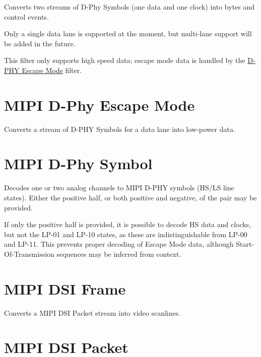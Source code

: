 Converts two streams of D-Phy Symbols (one data and one clock) into bytes and control events.

Only a single data lane is supported at the moment, but multi-lane support will be added in the future.

This filter only supports high speed data; escape mode data is handled by the \hyperref[filter:dphyescape]{D-PHY Escape
Mode} filter.

\pagebreak
\section{MIPI D-Phy Escape Mode}
\label{filter:dphyescape}

Converts a stream of D-PHY Symbols for a data lane into low-power data.

\pagebreak
\section{MIPI D-Phy Symbol}

Decodes one or two analog channels to MIPI D-PHY symbols (HS/LS line states). Either the positive half, or both
positive and negative, of the pair may be provided.

If only the positive half is provided, it is possible to decode HS data and clocks, but not the LP-01 and LP-10 states,
as these are indistinguishable from LP-00 and LP-11. This prevents proper decoding of Escape Mode data, although
Start-Of-Transmission sequences may be inferred from context.

\pagebreak
\section{MIPI DSI Frame}

Converts a MIPI DSI Packet stream into video scanlines.

\pagebreak
\section{MIPI DSI Packet}

